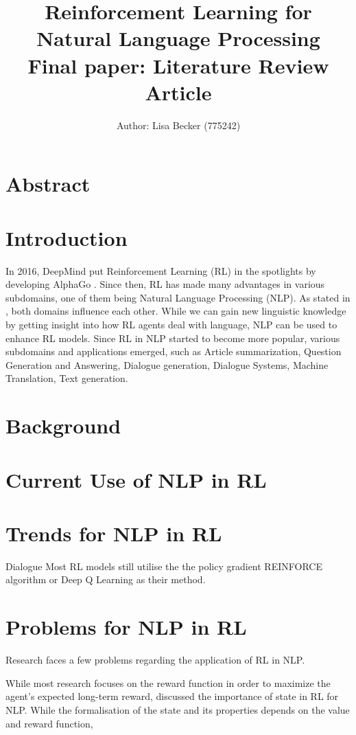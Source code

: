 \documentclass[11pt,a4paper]{article}
\title{{\LARGE Reinforcement Learning for Natural Language Processing}\\[1.5mm]
{\large Final paper: Literature Review Article}\\[1.5mm]}
\author{Author: Lisa Becker (775242) }
\begin{document}
\maketitle
\section{Abstract}


\section{Introduction}
In 2016, DeepMind put Reinforcement Learning (RL) in the spotlights by developing AlphaGo \citep{alphago}. Since then, RL has made many advantages in various subdomains, one of them being Natural Language Processing (NLP). As stated in \citet{ijcai2019}, both domains influence each other. While we can gain new linguistic knowledge by getting insight into how RL agents deal with language, NLP can be used to enhance RL models. Since RL in NLP started to become more popular, various subdomains and applications emerged, such as Article summarization, Question Generation and Answering, Dialogue generation, Dialogue Systems, Machine Translation, Text generation.

\section{Background}

\section{Current Use of NLP in RL}


\section{Trends for NLP in RL}
Dialogue 
Most RL models still utilise the the policy gradient REINFORCE algorithm or Deep Q Learning as their method.

\section{Problems for NLP in RL}
Research faces a few problems regarding the application of RL in NLP. 

While most research focuses on the reward function in order to maximize the agent's expected long-term reward, \citet{madureira2020} discussed the importance of state in RL for NLP. While the formalisation of the state and its properties depends on the value and reward function, 
\end{document}
